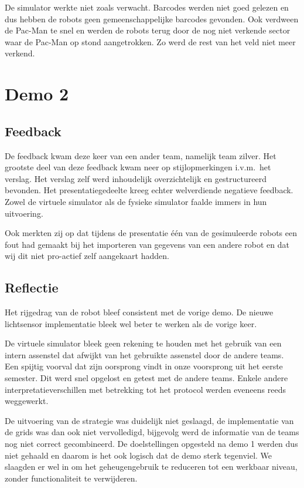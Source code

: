 \documentclass[12pt,a4paper]{report}
\begin{document}
De simulator werkte niet zoals verwacht. Barcodes werden niet goed gelezen en dus hebben de robots geen gemeenschappelijke barcodes gevonden. Ook verdween de Pac-Man te snel en werden de robots terug door de nog niet verkende sector waar de Pac-Man op stond aangetrokken. Zo werd de rest van het veld niet meer verkend.

\section{Demo 2}


\subsection{Feedback}

De feedback kwam deze keer van een ander team, namelijk team zilver. Het grootste deel van deze feedback kwam neer op stijlopmerkingen i.v.m.\ het verslag. Het verslag zelf werd inhoudelijk overzichtelijk en gestructureerd bevonden. Het presentatiegedeelte kreeg echter welverdiende negatieve feedback. Zowel de virtuele simulator als de fysieke simulator faalde immers in hun uitvoering.

Ook merkten zij op dat tijdens de presentatie \'e\'en van de gesimuleerde robots een fout had gemaakt bij het importeren van gegevens van een andere robot en dat wij dit niet pro-actief zelf aangekaart hadden. 

\subsection{Reflectie}

Het rijgedrag van de robot bleef consistent met de vorige demo. De nieuwe lichtsensor implementatie bleek wel beter te werken als de vorige keer.

De virtuele simulator bleek geen rekening te houden met het gebruik van een intern assenstel dat afwijkt van het gebruikte assenstel door de andere teams. Een spijtig voorval dat zijn oorsprong vindt in onze voorsprong uit het eerste semester. Dit werd snel opgelost en getest met de andere teams. Enkele andere interpretatieverschillen met betrekking tot het protocol werden eveneens reeds weggewerkt.

De uitvoering van de strategie was duidelijk niet geslaagd, de implementatie van de grids was dan ook niet vervolledigd, bijgevolg werd de informatie van de teams nog niet correct gecombineerd.
De doelstellingen opgesteld na demo 1 werden dus niet gehaald en daarom is het ook logisch dat de demo sterk tegenviel. We slaagden er wel in om het geheugengebruik te reduceren tot een werkbaar niveau, zonder functionaliteit te verwijderen.
\end{document}
